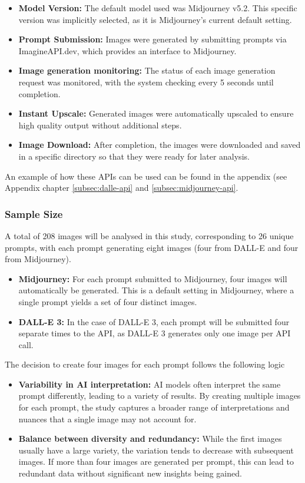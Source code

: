 \begin{itemize}
\item \textbf{Model Version:} The default model used was Midjourney v5.2. This specific version was implicitly selected, as it is Midjourney's current default setting.
\item \textbf{Prompt Submission:} Images were generated by submitting prompts via ImagineAPI.dev, which provides an interface to Midjourney.
\item \textbf{Image generation monitoring:} The status of each image generation request was monitored, with the system checking every 5 seconds until completion.
\item \textbf{Instant Upscale:} Generated images were automatically upscaled to ensure high quality output without additional steps.
\item \textbf{Image Download:} After completion, the images were downloaded and saved in a specific directory so that they were ready for later analysis.
\end{itemize}

An example of how these APIs can be used can be found in the appendix (see Appendix chapter \ref{subsec:dalle-api} and \ref{subsec:midjourney-api}.

\subsubsection{Sample Size}

A total of 208 images will be analysed in this study, corresponding to 26 unique prompts, with each prompt generating eight images (four from DALL-E and four from Midjourney).

\begin{itemize}
\item \textbf{Midjourney:} For each prompt submitted to Midjourney, four images will automatically be generated. This is a default setting in Midjourney, where a single prompt yields a set of four distinct images.
\item \textbf{DALL-E 3:} In the case of DALL-E 3, each prompt will be submitted four separate times to the API, as DALL-E 3 generates only one image per API call.
\end{itemize}

The decision to create four images for each prompt follows the following logic

\begin{itemize}
\item \textbf{Variability in AI interpretation:} AI models often interpret the same prompt differently, leading to a variety of results. By creating multiple images for each prompt, the study captures a broader range of interpretations and nuances that a single image may not account for.
\item \textbf{Balance between diversity and redundancy:} While the first images usually have a large variety, the variation tends to decrease with subsequent images. If more than four images are generated per prompt, this can lead to redundant data without significant new insights being gained.
\end{itemize}

